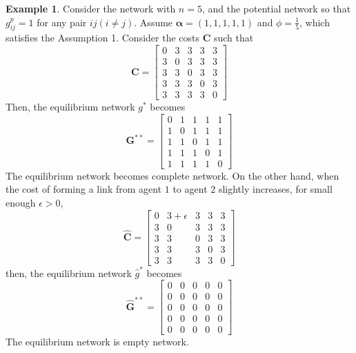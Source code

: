\documentclass[12pt]{article}
\theoremstyle{definition}
\newtheorem{example}{Example}
\begin{document}
\begin{example}
Consider the network with $n = 5$, and the potential network so that $g_{ij}^p = 1$ for any pair $ij(i \neq j)$.
Assume $\bm{\alpha} = (1, 1, 1, 1, 1)$ and $\phi = \frac{1}{5}$, which satisfies the Assumption 1.
Consider the costs $\bm{C}$ such that
\[ \bm{C} = \left[
			\begin{array}{ccccc}
				0 & 3 & 3 & 3 & 3 \\
				3 & 0 & 3 & 3 & 3 \\
				3 & 3 & 0 & 3 & 3 \\
				3 & 3 & 3 & 0 & 3  \\
				3 & 3 & 3 & 3 & 0
			\end{array} \right] \]
Then, the equilibrium network $g^*$ becomes
\[\bm{G}^{**} = \left[
			\begin{array}{ccccc}
				0 & 1 & 1 & 1 & 1 \\
				1 & 0 & 1 & 1 & 1 \\
				1 & 1 & 0 & 1 & 1 \\
				1 & 1 & 1 & 0 & 1 \\
				1 & 1 & 1 & 1 & 0
			\end{array} \right] \]
The equilibrium network becomes complete network.
On the other hand, when the cost of forming a link from agent $1$ to agent $2$ slightly increases, for small enough $\epsilon > 0$,
\[ \bm{\hat{C}} = \left[
			\begin{array}{ccccc}
				0 & 3 + \epsilon & 3 & 3 & 3 \\
				3 & 0 & 3 & 3 & 3 \\
				3 & 3 & 0 & 3 & 3 \\
				3 & 3 & 3 & 0 & 3  \\
				3 & 3 & 3 & 3 & 0
			\end{array} \right] \]
then, the equilibrium network $\hat{g}^*$ becomes
\[ \bm{\hat{G}}^{**} = \left[
			\begin{array}{ccccc}
				0 & 0 & 0 & 0 & 0 \\
				0 & 0 & 0 & 0 & 0 \\
				0 & 0 & 0 & 0 & 0 \\
				0 & 0 & 0 & 0 & 0 \\
				0 & 0 & 0 & 0 & 0
			\end{array} \right] \]
The equilibrium network is empty network.
\end{example}
\end{document}
